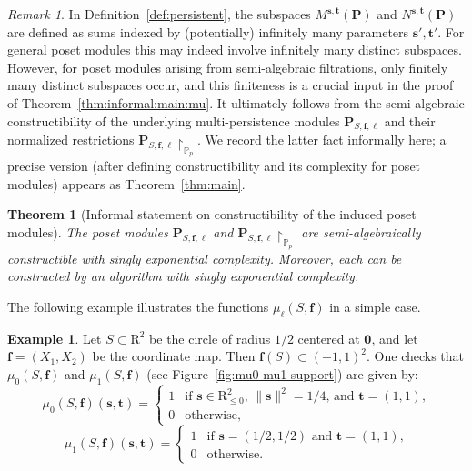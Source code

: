 \documentclass{amsart}[10pts]
\newtheorem*{theorem*}{Theorem}
\theoremstyle{definition}
\newtheorem{example}{Example}[section]
\theoremstyle{remark}
\newtheorem{remark}{Remark}
\theoremstyle{observation}
\numberwithin{equation}{section}
\newcommand {\R} {\mathrm{R}}
\newcommand {\PP}     {\mathbb{P}} %
\begin{document}
\begin{remark}
\label{rem:finite}
In Definition~\ref{def:persistent}, the subspaces $M^{\mathbf s,\mathbf t}(\mathbf P)$ and $N^{\mathbf s,\mathbf t}(\mathbf P)$ are defined as sums indexed by (potentially) infinitely many parameters $\mathbf s',\mathbf t'$.
For general poset modules this may indeed involve infinitely many distinct subspaces. 
However, for poset modules arising from semi-algebraic filtrations, only finitely many distinct subspaces occur, and this finiteness is a crucial input in the proof of Theorem~\ref{thm:informal:main:mu}.
It ultimately follows from the semi-algebraic constructibility of the underlying multi-persistence modules $\mathbf P_{S,\mathbf f,\ell}$ and their normalized restrictions $\mathbf P_{S,\mathbf f,\ell}\!\restriction_{\PP_p}$.
We record the latter fact informally here; a precise version (after defining constructibility and its complexity for poset modules) appears as Theorem~\ref{thm:main}.
\end{remark}

\begin{theorem*}[Informal statement on constructibility of the induced poset modules]
\label{thm:informal:main}
The poset modules $\mathbf P_{S,\mathbf f,\ell}$ and $\mathbf P_{S,\mathbf f,\ell}\!\restriction_{\PP_p}$ are semi-algebraically constructible with singly exponential complexity. Moreover, each can be constructed by an algorithm with singly exponential complexity.
\end{theorem*}

The following example illustrates the functions $\mu_\ell(S,\mathbf f)$ in a simple case.

\begin{example}
Let $S\subset \R^2$ be the circle of radius $1/2$ centered at $\mathbf 0$, and let $\mathbf f=(X_1,X_2)$ be the coordinate map. Then $\mathbf f(S)\subset (-1,1)^2$.
One checks that $\mu_0(S,\mathbf f)$ and $\mu_1(S,\mathbf f)$ (see Figure~\ref{fig:mu0-mu1-support}) are given by:
\[
\mu_0(S,\mathbf f)(\mathbf s,\mathbf t)=
\begin{cases}
1 & \text{if $\mathbf s\in \R_{\le 0}^2$, $\|\mathbf s\|^2=1/4$, and $\mathbf t=(1,1)$,}\\
0 & \text{otherwise,}
\end{cases}
\]
\[
\mu_1(S,\mathbf f)(\mathbf s,\mathbf t)=
\begin{cases}
1 & \text{if $\mathbf s=(1/2,1/2)$ and $\mathbf t=(1,1)$,}\\
0 & \text{otherwise.}
\end{cases}
\]
\end{example}
\end{document}
